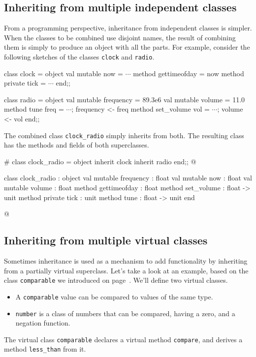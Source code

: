 \subsection{Inheriting from multiple independent classes}

From a programming perspective, inheritance from independent classes is simpler.  When the classes
to be combined use disjoint names, the result of combining them is simply to produce an object with
all the parts.  For example, consider the following sketches of the classes \hbox{\lstinline/clock/}
and \hbox{\lstinline/radio/}.

\begin{ocaml}
class clock =
object
   val mutable now = $\cdots$
   method gettimeofday = now
   method private tick = $\cdots$
end;;

class radio =
object
   val mutable frequency = 89.3e6
   val mutable volume = 11.0
   method tune freq = $\cdots$; frequency <- freq
   method set_volume vol = $\cdots$; volume <- vol
end;;
\end{ocaml}
%
The combined class \hbox{\lstinline/clock_radio/} simply inherits from both.  The resulting class has the
methods and fields of both superclasses.

\begin{ocaml}
# class clock_radio =
  object
     inherit clock
     inherit radio
  end;;
@
\begin{topoutput}
class clock_radio :
  object
    val mutable frequency : float
    val mutable now : float
    val mutable volume : float
    method gettimeofday : float
    method set_volume : float -> unit
    method private tick : unit
    method tune : float -> unit
  end
\end{topoutput}
@
\end{ocaml}

\subsection{Inheriting from multiple virtual classes}

Sometimes inheritance is used as a mechanism to add functionality by inheriting from a partially
virtual superclass.  Let's take a look at an example, based on the class \hbox{\lstinline/comparable/} we
introduced on page~\pageref{page:comparable}.  We'll define two virtual classes.

\begin{itemize}
\item A \hbox{\lstinline/comparable/} value can be compared to values of the same type.
\item \lstinline/number/ is a class of numbers that can be compared, having a zero, and a negation function.
\end{itemize}
%
The virtual class \hbox{\lstinline/comparable/} declares a virtual method \hbox{\lstinline/compare/}, and derives a
method \hbox{\lstinline/less_than/} from it.

